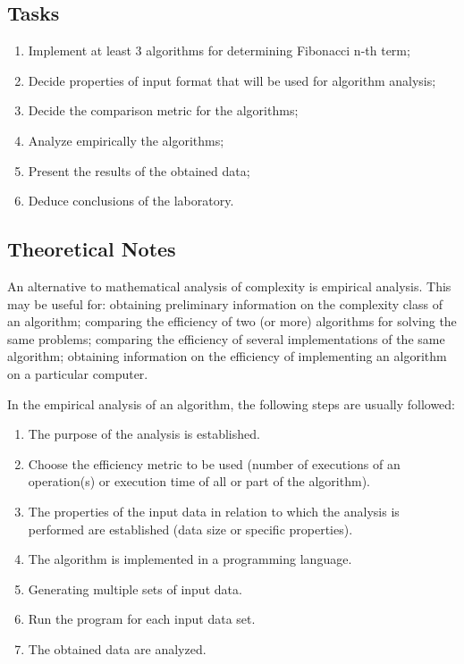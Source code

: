 \documentclass[12pt]{article}
\begin{document}
\subsection{Tasks}
\begin{enumerate}
    \item Implement at least 3 algorithms for determining Fibonacci n-th term;
    \item Decide properties of input format that will be used for algorithm analysis;
    \item Decide the comparison metric for the algorithms;
    \item Analyze empirically the algorithms;
    \item Present the results of the obtained data;
    \item Deduce conclusions of the laboratory. 
\end{enumerate}

\subsection{Theoretical Notes}
\hspace{0.8cm} An alternative to mathematical analysis of complexity is empirical analysis.
This may be useful for: obtaining preliminary information on the complexity class of an
algorithm; comparing the efficiency of two (or more) algorithms for solving the same problems;
comparing the efficiency of several implementations of the same algorithm; obtaining information on the
efficiency of implementing an algorithm on a particular computer.

In the empirical analysis of an algorithm, the following steps are usually followed:

\begin{enumerate}
    \item The purpose of the analysis is established.
    \item Choose the efficiency metric to be used (number of executions of an operation(s) or execution time of all or part of the algorithm).
    \item The properties of the input data in relation to which the analysis is performed are established (data size or specific properties).
    \item The algorithm is implemented in a programming language.
    \item Generating multiple sets of input data.
    \item Run the program for each input data set.
    \item The obtained data are analyzed.
\end{enumerate}
\end{document}
